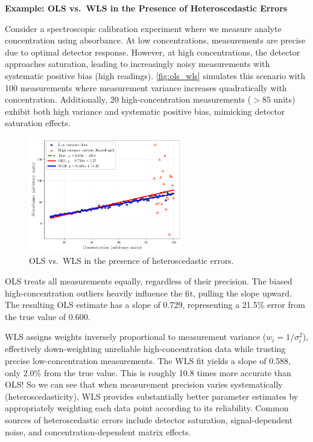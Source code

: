 \begin{exampleBox}
    \textbf{Example: OLS vs.\ WLS in the Presence of Heteroscedastic Errors}
    
    Consider a spectroscopic calibration experiment where we measure analyte concentration using absorbance. At low concentrations, measurements are precise due to optimal detector response. However, at high concentrations, the detector approaches saturation, leading to increasingly noisy measurements with systematic positive bias (high readings). \autoref{fig:ols_wls} simulates this scenario with 100 measurements where measurement variance increases quadratically with concentration. Additionally, 20 high-concentration measurements ($>85$ units) exhibit both high variance and systematic positive bias, mimicking detector saturation effects.

    \begin{figure}[H]
        \centering
        \includegraphics[width=0.6\textwidth]{figs/models-vs-data/ols_wls.pdf}
        \caption{OLS vs.\ WLS in the presence of heteroscedastic errors.}
        \label{fig:ols_wls}
    \end{figure}

    OLS treats all measurements equally, regardless of their precision. The biased high-concentration outliers heavily influence the fit, pulling the slope upward. The resulting OLS estimate has a slope of 0.729, representing a 21.5\% error from the true value of 0.600.
    
    WLS assigns weights inversely proportional to measurement variance ($w_i = 1/\sigma_i^2$), effectively down-weighting unreliable high-concentration data while trusting precise low-concentration measurements. The WLS fit yields a slope of 0.588, only 2.0\% from the true value. This is roughly 10.8 times more accurate than OLS! So we can see that when measurement precision varies systematically (heteroscedasticity), WLS provides substantially better parameter estimates by appropriately weighting each data point according to its reliability. Common sources of heteroscedastic errors include detector saturation, signal-dependent noise, and concentration-dependent matrix effects.
    
\end{exampleBox}

